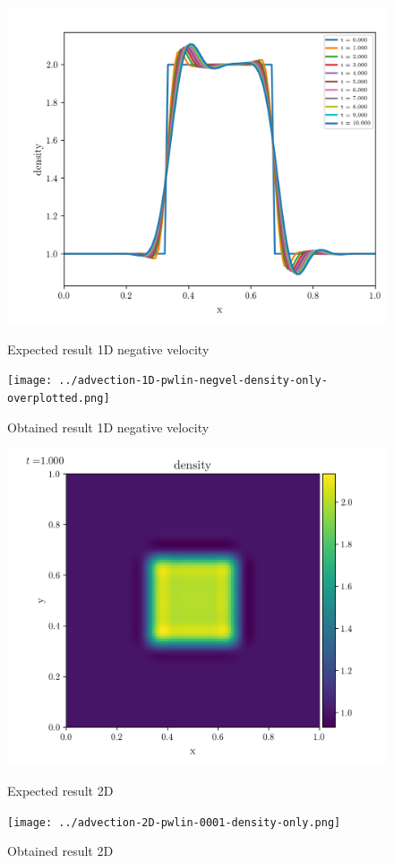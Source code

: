     \begin{figure}[htbp]
        \centering
        \includegraphics[width=.7\textwidth]{./figures/advection-1D-pwlin-negvel-density-only-overplotted.png}%
        \caption{Expected result 1D negative velocity}
        \texttt{[image: ../advection-1D-pwlin-negvel-density-only-overplotted.png]}%
        \caption{Obtained result 1D negative velocity}
    \end{figure}

    \begin{figure}[htbp]
        \centering
        \includegraphics[width=.7\textwidth]{./figures/advection-2D-pwlin-0001-density-only.png}%
        \caption{Expected result 2D}
        \texttt{[image: ../advection-2D-pwlin-0001-density-only.png]}%
        \caption{Obtained result 2D}
    \end{figure}

